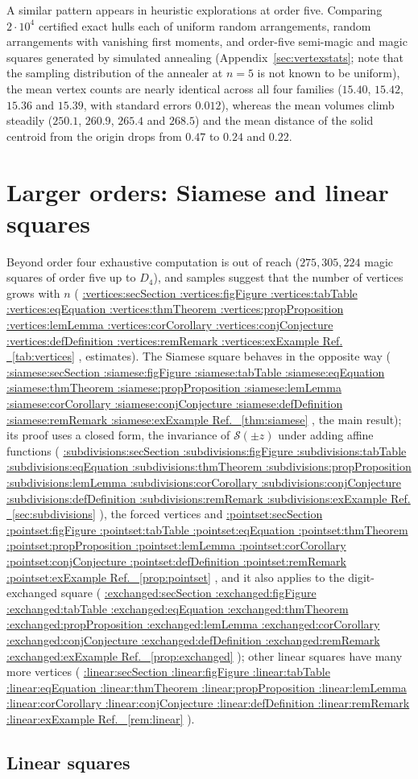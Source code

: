 \documentclass[11pt,a4paper]{article}
\makeatletter
\def\Cref@getprefix#1:#2\relax{#1}
\def\Cref@prefix@sec{sec}
\def\Cref@prefix@fig{fig}
\def\Cref@prefix@tab{tab}
\def\Cref@prefix@eq{eq}
\def\Cref@prefix@thm{thm}
\def\Cref@prefix@prop{prop}
\def\Cref@prefix@lem{lem}
\def\Cref@prefix@cor{cor}
\def\Cref@prefix@conj{conj}
\def\Cref@prefix@def{def}
\def\Cref@prefix@rem{rem}
\def\Cref@prefix@ex{ex}
\def\Cref@type@cap#1{%
  \edef\Cref@tmp{#1}%
  \ifx\Cref@tmp\Cref@prefix@sec Section%
  \else\ifx\Cref@tmp\Cref@prefix@fig Figure%
  \else\ifx\Cref@tmp\Cref@prefix@tab Table%
  \else\ifx\Cref@tmp\Cref@prefix@eq Equation%
  \else\ifx\Cref@tmp\Cref@prefix@thm Theorem%
  \else\ifx\Cref@tmp\Cref@prefix@prop Proposition%
  \else\ifx\Cref@tmp\Cref@prefix@lem Lemma%
  \else\ifx\Cref@tmp\Cref@prefix@cor Corollary%
  \else\ifx\Cref@tmp\Cref@prefix@conj Conjecture%
  \else\ifx\Cref@tmp\Cref@prefix@def Definition%
  \else\ifx\Cref@tmp\Cref@prefix@rem Remark%
  \else\ifx\Cref@tmp\Cref@prefix@ex Example%
  \else Ref.%
  \fi\fi\fi\fi\fi\fi\fi\fi\fi\fi\fi\fi
}
\DeclareRobustCommand{\Cref}[1]{%
  \begingroup
  \edef\Cref@label{#1}%
  \edef\Cref@prefix{\expandafter\Cref@getprefix\Cref@label:\relax}%
  \hyperref[#1]{\Cref@type@cap{\Cref@prefix}~\ref*{#1}}%
  \endgroup
}
\theoremstyle{plain}
\theoremstyle{definition}
\theoremstyle{remark}
\makeatother
\begin{document}
A similar pattern appears in heuristic explorations at order five. Comparing $2\cdot10^4$ certified exact hulls each of uniform random arrangements, random arrangements with vanishing first moments, and order-five semi-magic and magic squares generated by simulated annealing (Appendix~\ref{sec:vertexstats}; note that the sampling distribution of the annealer at $n=5$ is not known to be uniform), the mean vertex counts are nearly identical across all four families ($15.40$, $15.42$, $15.36$ and $15.39$, with standard errors $0.012$), whereas the mean volumes climb steadily ($250.1$, $260.9$, $265.4$ and $268.5$) and the mean distance of the solid centroid from the origin drops from $0.47$ to $0.24$ and $0.22$.

\section{Larger orders: Siamese and linear squares}
\label{sec:siamese-gems}

Beyond order four exhaustive computation is out of reach ($275{,}305{,}224$ magic squares of order five up to $D_4$), and samples suggest that the number of vertices grows with $n$ (\Cref{tab:vertices}, estimates).
The Siamese square behaves in the opposite way (\Cref{thm:siamese}, the main result); its proof uses a closed form, the invariance of $\mathcal S(\pm z)$ under adding affine functions (\Cref{sec:subdivisions}), the forced vertices and \Cref{prop:pointset}, and it also applies to the digit-exchanged square (\Cref{prop:exchanged}); other linear squares have many more vertices (\Cref{rem:linear}).

\subsection{Linear squares}
\end{document}
